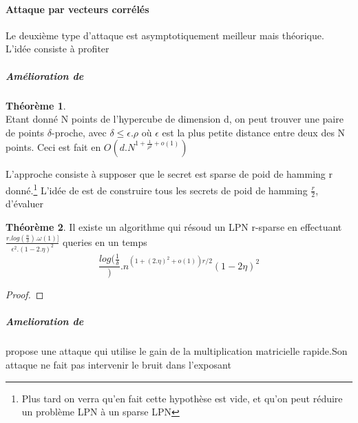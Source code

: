 \documentclass{article}		%
\theoremstyle{definition}
\newtheorem{theo}{Théorème}
\theoremstyle{plain}
\begin{document}
\paragraph{Attaque par vecteurs corrélés}
Le deuxième type d'attaque est asymptotiquement meilleur mais théorique.
L'idée consiste à profiter 
\subparagraph{Amélioration de \cite{Grigo}}
\begin{theo}\cite{Indyk}
      \\ Etant donné N points de l'hypercube de dimension d, on peut
trouver une paire de points $\delta$-proche, avec $\delta \leq
\epsilon.\rho$ où $\epsilon$ est la plus petite distance entre deux
 des N points. Ceci est fait en $O(d.N^{1+\frac{1}{\rho^2}+o(1)})$
        \end{theo} 
  L'approche consiste à supposer que le secret est sparse de poid de
hamming r
donné.\footnote{Plus tard on verra qu'en fait cette hypothèse est vide,
et qu'on peut réduire un problème LPN à un sparse LPN}
   L'idée de \cite{Grigo} est de construire tous les secrets de poid de
hamming $\frac{r}{2}$, d'évaluer 
      \begin{theo} Il existe un algorithme qui résoud un LPN r-sparse en
effectuant
$\frac{r.log(\frac{n}{\delta}).\omega(1)]}{\epsilon^2.(1-2.\eta)^2}$
queries en un temps
$$\frac{log(\frac{1}{\delta}}).n^{(1+(2.\eta)^2+o(1))r/2}{(1-2\eta)^2}$$
      \end{theo}
      \begin{proof}
      \end{proof}

\subparagraph{Amelioration de \cite{Valiant}} \cite{Valiant} propose une attaque qui utilise le gain de la
multiplication matricielle rapide.Son attaque ne fait pas intervenir le
bruit dans l'exposant
\end{document}
